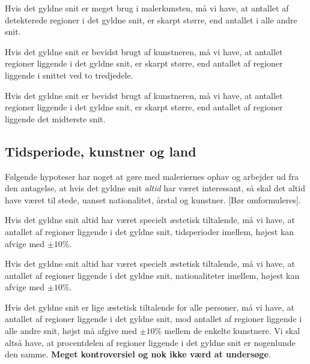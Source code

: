 {\begin{hypotese}
    Hvis det gyldne snit er meget brug i malerkunsten, må vi have, at
    antallet af detekterede regioner i det gyldne snit, er skarpt
    større, end antallet i alle andre snit.
\end{hypotese}

\begin{hypotese}
    Hvis det gyldne snit er bevidst brugt af kunstneren, må vi have, at
    antallet regioner liggende i det gyldne snit, er skarpt større, end
    antallet af regioner liggende i snittet ved to tredjedele.
\end{hypotese}

\begin{hypotese}
    Hvis det gyldne snit er bevidst brugt af kunstneren, må vi have, at
    antallet regioner liggende i det gyldne snit, er skarpt større, end
    antallet af regioner liggende det midterste snit.
\end{hypotese}

\subsection{Tidsperiode, kunstner og land}
Følgende hypoteser har noget at gøre med maleriernes ophav og arbejder
ud fra den antagelse, at hvis det gyldne snit \emph{altid} har været
interessant, så skal det altid have været til stede, uanset
nationalitet, årstal og kunstner. [Bør omformuleres].

\begin{hypotese}
    Hvis det gyldne snit altid har været specielt æstetisk tiltalende,
    må vi have, at antallet af regioner liggende i det gyldne snit,
    tidsperioder imellem, højest kan afvige med $\pm10\%$.
\end{hypotese}

\begin{hypotese}
    Hvis det gyldne snit altid har været specielt æstetisk tiltalende,
    må vi have, at antallet af regioner liggende i det gyldne snit,
    nationaliteter imellem, højest kan afvige med $\pm10\%$.
\end{hypotese}

\begin{hypotese}
    Hvis det gyldne snit er lige æstetisk tiltalende for alle personer,
    må vi have, at antallet af regioner liggende i det gyldne snit, mod
    antallet af regioner liggende i alle andre snit, højst må afgive med
    $\pm10\%$ mellem de enkelte kunstnere. Vi skal altså have, at
    procentdelen af regioner liggende i det gyldne snit er nogenlunde
    den samme.  \textbf{Meget kontroversiel og nok ikke værd
    at undersøge}.
\end{hypotese}

}
